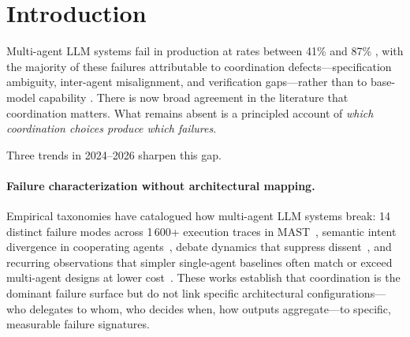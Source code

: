 \documentclass[11pt]{article}
\begin{document}
\begin{abstract}
\medskip
\noindent\textbf{Keywords:} multi-agent systems; LLM agents; coordination architectures; declarative orchestration; proper scoring rules; Murphy decomposition; prediction markets; observational power analysis.

\medskip
\noindent\textbf{JEL Classification:} C53 (Forecasting Models; Simulation Methods); G14 (Information and Market Efficiency; Event Studies); C18 (Methodological Issues: General); O33 (Technological Change: Choices and Consequences); D83 (Search; Learning; Information; Belief).
\end{abstract}

\section{Introduction}
\label{sec:intro}

Multi-agent LLM systems fail in production at rates between 41\% and 87\% \citep{cemri2025mast}, with the majority of these failures attributable to coordination defects---specification ambiguity, inter-agent misalignment, and verification gaps---rather than to base-model capability \citep{cemri2025mast,sid2026}. There is now broad agreement in the literature that coordination matters. What remains absent is a principled account of \emph{which coordination choices produce which failures}.

Three trends in 2024--2026 sharpen this gap.

\paragraph{Failure characterization without architectural mapping.}
Empirical taxonomies have catalogued how multi-agent LLM systems break: 14 distinct failure modes across 1\,600+ execution traces in MAST~\citep{cemri2025mast}, semantic intent divergence in cooperating agents~\citep{sid2026}, debate dynamics that suppress dissent~\citep{wynn2025talk}, and recurring observations that simpler single-agent baselines often match or exceed multi-agent designs at lower cost~\citep{xu2026rethinking,xia2024agentless}. These works establish that coordination is the dominant failure surface but do not link specific architectural configurations---who delegates to whom, who decides when, how outputs aggregate---to specific, measurable failure signatures.
\end{document}
